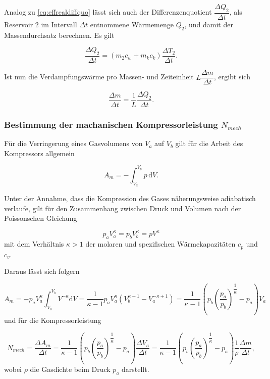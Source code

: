 Analog zu \eqref{eq:effrealdiffquo} lässt sich auch der Differenzenquotient $\dfrac{ΔQ_2}{Δt}$, als Reservoir 2 im Intervall $Δt$ entnommene Wärmemenge $Q_2$, und damit der Massendurchsatz berechnen.
Es gilt

\begin{equation}
    \label{eq:Massendurch}
    \dfrac{ΔQ_2}{Δt} = (m_2c_w +m_kc_k)\dfrac{ΔT_2}{Δt}.
\end{equation}

Ist nun die Verdampfungswärme pro Massen- und Zeiteinheit $L\dfrac{Δm}{Δt}$, ergibt sich

\begin{equation}
    \dfrac{Δm}{Δt} = \dfrac{1}{L}\dfrac{ΔQ_2}{Δt}.
    \label{eq:Massendurch2}
\end{equation}

\newpage

\subsubsection{Bestimmung der machanischen Kompressorleistung $N_{mech}$}

Für die Verringerung eines Gasvolumens von $V_a$ auf $V_b$ gilt für die Arbeit des Kompressors allgemein

\begin{equation}
    A_m= -\int_{V_a}^{V_b} p \, \text{d}V.
\end{equation}

Unter der Annahme, dass die Kompression des Gases näherungsweise adiabatisch verlaufe, gilt für den Zusammenhang zwischen Druck und Volumen nach der Poissonschen Gleichung

\begin{equation}
    p_aV_a^κ=p_bV_b^κ=pV^κ
\end{equation}
mit dem Verhältnis $κ > 1$ der molaren und spezifischen Wärmekapazitäten $c_p$ und $c_v$.

Daraus lässt sich folgern

\begin{equation}
    A_m=-p_aV_a^κ\int_{V_a}^{V_b} V^{-κ} \text{d}V = 
    \dfrac{1}{κ-1}p_aV_a^κ \left (V_b^{κ-1}-V_a^{-κ+1} \right)= \dfrac{1}{κ-1} \left(p_b\left(\dfrac{p_a}{p_b}\right)^{\dfrac{1}{κ}}-p_a\right)V_a
     \nonumber
\end{equation}
und für die Kompressorleistung

\begin{equation}
    \label{eq:kompressorleistung}
    N_{mech}= \dfrac{ΔA_m}{Δt} = \dfrac{1}{κ-1} \left(p_b\left(\dfrac{p_a}{p_b}\right)^{\dfrac{1}{κ}}-p_a\right) \dfrac{ΔV_a}{Δt} = 
    \dfrac{1}{κ-1} \left (p_b \left(\dfrac{p_a}{p_b} \right)^{\dfrac{1}{κ}}-p_a \right) \dfrac{1}{ρ}\dfrac{Δm}{Δt},
\end{equation}
wobei $ρ$ die Gasdichte beim Druck $p_a$ darstellt.
    

